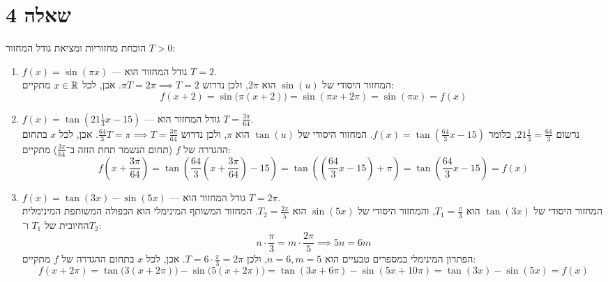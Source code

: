 \section{שאלה 4}
הוכחת מחזוריות ומציאת גודל המחזור $T > 0$:
\begin{enumerate}
	\item $f(x) = \sin(\pi x)$ --- גודל המחזור הוא $T = 2$. \\
		המחזור היסודי של $\sin(u)$ הוא $2\pi$, ולכן נדרוש $\pi T = 2\pi \implies T = 2$.
		אכן, לכל $x \in \mathbb{R}$ מתקיים:
		\[
			f(x + 2) = \sin\big(\pi(x + 2)\big) = \sin(\pi x + 2\pi) = \sin(\pi x) = f(x)
		\]

	\item $f(x) = \tan\left(21\frac{1}{3}x - 15\right)$ --- גודל המחזור הוא $T = \frac{3\pi}{64}$. \\
		נרשום $21\frac{1}{3} = \frac{64}{3}$, כלומר $f(x) = \tan\left(\frac{64}{3}x - 15\right)$. המחזור היסודי של $\tan(u)$ הוא $\pi$, ולכן נדרוש $\frac{64}{3}T = \pi \implies T = \frac{3\pi}{64}$.
		אכן, לכל $x$ בתחום ההגדרה של $f$ (תחום הנשמר תחת הזזה ב־$\frac{3\pi}{64}$) מתקיים:
		\[
			f\left(x + \frac{3\pi}{64}\right) = \tan\left(\frac{64}{3}\left(x + \frac{3\pi}{64}\right) - 15\right) = \tan\left(\left(\frac{64}{3}x - 15\right) + \pi\right) = \tan\left(\frac{64}{3}x - 15\right) = f(x)
		\]

	\item $f(x) = \tan(3x) - \sin(5x)$ --- גודל המחזור הוא $T = 2\pi$. \\
		המחזור היסודי של $\tan(3x)$ הוא $T_1 = \frac{\pi}{3}$, והמחזור היסודי של $\sin(5x)$ הוא $T_2 = \frac{2\pi}{5}$. המחזור המשותף המינימלי הוא הכפולה המשותפת המינימלית החיובית של $T_1$ ו־$T_2$:
		\[
			n \cdot \frac{\pi}{3} = m \cdot \frac{2\pi}{5} \implies 5n = 6m
		\]
		הפתרון המינימלי במספרים טבעיים הוא $n = 6, m = 5$, ולכן $T = 6 \cdot \frac{\pi}{3} = 2\pi$.
		אכן, לכל $x$ בתחום ההגדרה של $f$ מתקיים:
		\[
			f(x + 2\pi) = \tan\big(3(x + 2\pi)\big) - \sin\big(5(x + 2\pi)\big) = \tan(3x + 6\pi) - \sin(5x + 10\pi) = \tan(3x) - \sin(5x) = f(x)
		\]
\end{enumerate}

